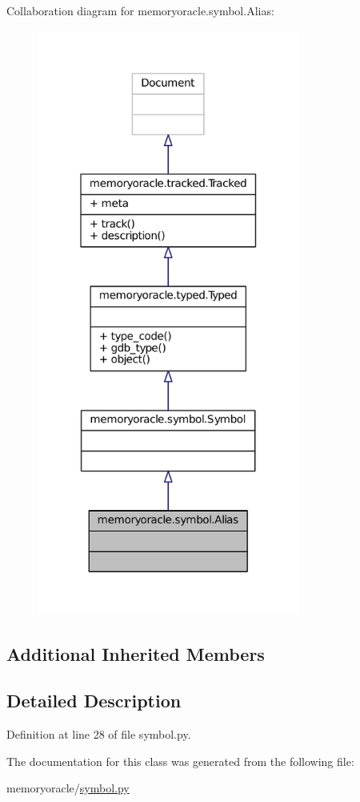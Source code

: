Collaboration diagram for memoryoracle.\+symbol.\+Alias\+:
\nopagebreak
\begin{figure}[H]
\begin{center}
\leavevmode
\includegraphics[width=244pt]{classmemoryoracle_1_1symbol_1_1Alias__coll__graph}
\end{center}
\end{figure}
\subsection*{Additional Inherited Members}


\subsection{Detailed Description}


Definition at line 28 of file symbol.\+py.



The documentation for this class was generated from the following file\+:\begin{DoxyCompactItemize}
\item 
memoryoracle/\hyperlink{symbol_8py}{symbol.\+py}\end{DoxyCompactItemize}
